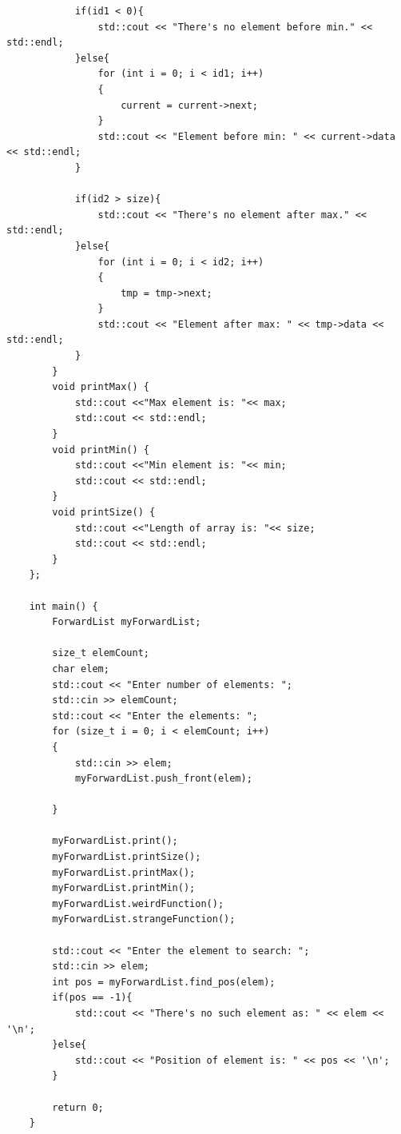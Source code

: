 \documentclass[12pt]{extarticle}
\begin{document}
\begin{verbatim}
            if(id1 < 0){
                std::cout << "There's no element before min." << std::endl;
            }else{
                for (int i = 0; i < id1; i++)
                {
                    current = current->next;
                }
                std::cout << "Element before min: " << current->data << std::endl;
            }
    
            if(id2 > size){
                std::cout << "There's no element after max." << std::endl;
            }else{
                for (int i = 0; i < id2; i++)
                {
                    tmp = tmp->next;
                }
                std::cout << "Element after max: " << tmp->data << std::endl;
            }
        }
        void printMax() {
            std::cout <<"Max element is: "<< max;
            std::cout << std::endl;
        }
        void printMin() {
            std::cout <<"Min element is: "<< min;
            std::cout << std::endl;
        }
        void printSize() {
            std::cout <<"Length of array is: "<< size;
            std::cout << std::endl;
        }
    };
    
    int main() {
        ForwardList myForwardList;
    
        size_t elemCount;
        char elem;
        std::cout << "Enter number of elements: ";
        std::cin >> elemCount;
        std::cout << "Enter the elements: ";
        for (size_t i = 0; i < elemCount; i++)
        {
            std::cin >> elem;
            myForwardList.push_front(elem);
    
        }
        
        myForwardList.print();
        myForwardList.printSize();
        myForwardList.printMax();
        myForwardList.printMin();
        myForwardList.weirdFunction();
        myForwardList.strangeFunction();
    
        std::cout << "Enter the element to search: ";
        std::cin >> elem;
        int pos = myForwardList.find_pos(elem);
        if(pos == -1){
            std::cout << "There's no such element as: " << elem << '\n';
        }else{
            std::cout << "Position of element is: " << pos << '\n';
        }
    
        return 0;
    }
    
    
\end{verbatim}
\vspace{12pt}
\end{document}
